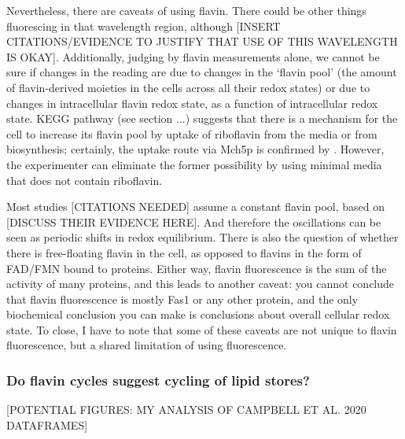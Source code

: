 Nevertheless, there are caveats of using flavin.
There could be other things fluorescing in that wavelength region, although [INSERT CITATIONS/EVIDENCE TO JUSTIFY THAT USE OF THIS WAVELENGTH IS OKAY].
Additionally, judging by flavin measurements alone, we cannot be sure if changes in the reading are due to changes in the `flavin pool' (the amount of flavin-derived moieties in the cells across all their redox states) or due to changes in intracellular flavin redox state, as a function of intracellular redox state.
KEGG pathway (see section ...) suggests that there is a mechanism for the cell to increase its flavin pool by uptake of riboflavin from the media or from biosynthesis; certainly, the uptake route via Mch5p is confirmed by \textcite{gudipatiFlavoproteomeYeastSaccharomyces2014}.
However, the experimenter can eliminate the former possibility by using minimal media that does not contain riboflavin.

Most studies [CITATIONS NEEDED] assume a constant flavin pool, based on [DISCUSS THEIR EVIDENCE HERE].
And therefore the oscillations can be seen as periodic shifts in redox equilibrium.
There is also the question of whether there is free-floating flavin in the cell, as opposed to flavins in the form of FAD/FMN bound to proteins.
Either way, flavin fluorescence is the sum of the activity of many proteins, and this leads to another caveat: you cannot conclude that flavin fluorescence is mostly Fas1 or any other protein, and the only biochemical conclusion you can make is conclusions about overall cellular redox state.
To close, I have to note that some of these caveats are not unique to flavin fluorescence, but a shared limitation of using fluorescence.

\subsubsection{Do flavin cycles suggest cycling of lipid stores?}
\label{subsubsec:intro-flavin-ymc-lipid_cycling}

[POTENTIAL FIGURES: MY ANALYSIS OF CAMPBELL ET AL. 2020 DATAFRAMES]

